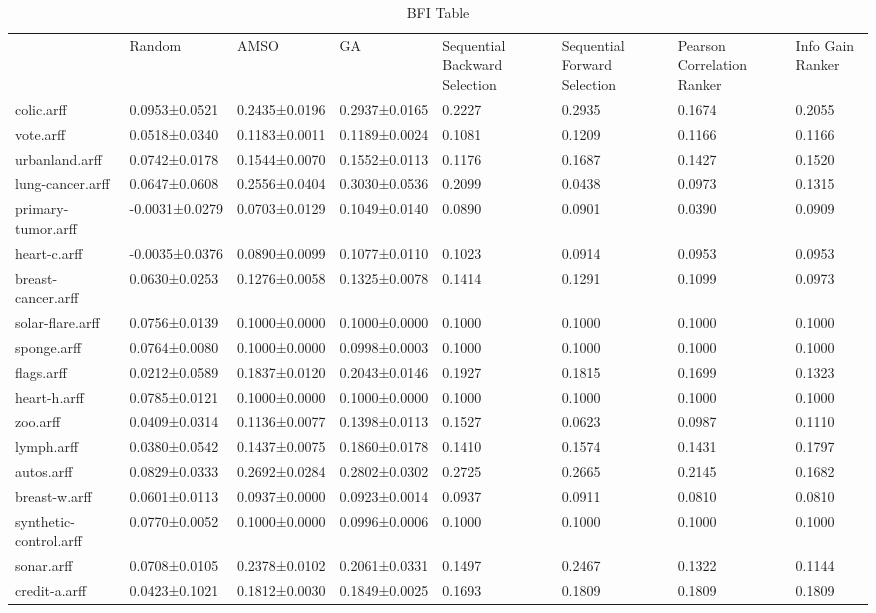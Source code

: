 \begin{table*}[h]
\caption{BFI Table}
\label{tbl:bfi}\begin{tabular}{llllllll}
\noalign{\smallskip}\hline\noalign{\smallskip}
&Random&AMSO&GA&Sequential Backward Selection&Sequential Forward Selection&Pearson Correlation Ranker&Info Gain Ranker\\\noalign{\smallskip}\hline
colic.arff&0.0953±0.0521&0.2435±0.0196&0.2937±0.0165&0.2227&0.2935&0.1674&0.2055\\
vote.arff&0.0518±0.0340&0.1183±0.0011&0.1189±0.0024&0.1081&0.1209&0.1166&0.1166\\
urbanland.arff&0.0742±0.0178&0.1544±0.0070&0.1552±0.0113&0.1176&0.1687&0.1427&0.1520\\
lung-cancer.arff&0.0647±0.0608&0.2556±0.0404&0.3030±0.0536&0.2099&0.0438&0.0973&0.1315\\
primary-tumor.arff&-0.0031±0.0279&0.0703±0.0129&0.1049±0.0140&0.0890&0.0901&0.0390&0.0909\\
heart-c.arff&-0.0035±0.0376&0.0890±0.0099&0.1077±0.0110&0.1023&0.0914&0.0953&0.0953\\
breast-cancer.arff&0.0630±0.0253&0.1276±0.0058&0.1325±0.0078&0.1414&0.1291&0.1099&0.0973\\
solar-flare.arff&0.0756±0.0139&0.1000±0.0000&0.1000±0.0000&0.1000&0.1000&0.1000&0.1000\\
sponge.arff&0.0764±0.0080&0.1000±0.0000&0.0998±0.0003&0.1000&0.1000&0.1000&0.1000\\
flags.arff&0.0212±0.0589&0.1837±0.0120&0.2043±0.0146&0.1927&0.1815&0.1699&0.1323\\
heart-h.arff&0.0785±0.0121&0.1000±0.0000&0.1000±0.0000&0.1000&0.1000&0.1000&0.1000\\
zoo.arff&0.0409±0.0314&0.1136±0.0077&0.1398±0.0113&0.1527&0.0623&0.0987&0.1110\\
lymph.arff&0.0380±0.0542&0.1437±0.0075&0.1860±0.0178&0.1410&0.1574&0.1431&0.1797\\
autos.arff&0.0829±0.0333&0.2692±0.0284&0.2802±0.0302&0.2725&0.2665&0.2145&0.1682\\
breast-w.arff&0.0601±0.0113&0.0937±0.0000&0.0923±0.0014&0.0937&0.0911&0.0810&0.0810\\
synthetic-control.arff&0.0770±0.0052&0.1000±0.0000&0.0996±0.0006&0.1000&0.1000&0.1000&0.1000\\
sonar.arff&0.0708±0.0105&0.2378±0.0102&0.2061±0.0331&0.1497&0.2467&0.1322&0.1144\\
credit-a.arff&0.0423±0.1021&0.1812±0.0030&0.1849±0.0025&0.1693&0.1809&0.1809&0.1809\\

\end{tabular}
\end{table*}
